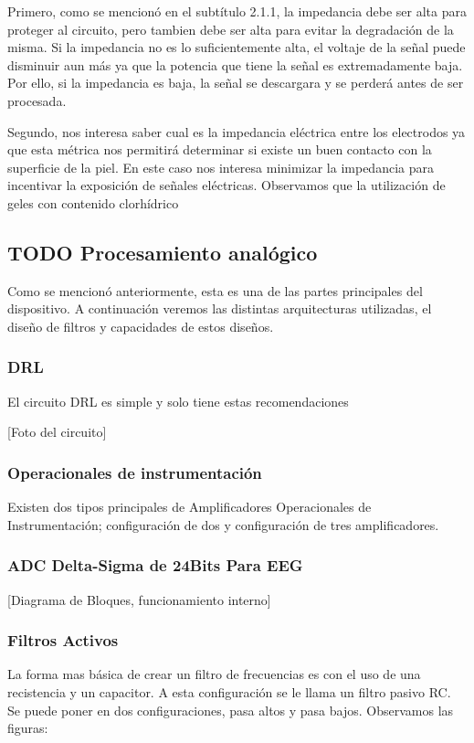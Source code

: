 \documentclass[11pt]{article}
\begin{document}
\begin{enumerate}
Primero, como se mencionó en el subtítulo 2.1.1, la impedancia debe ser alta para proteger al circuito, pero tambien debe ser alta para evitar la degradación de la misma. Si la impedancia no es lo suficientemente alta, el voltaje de la señal puede disminuir aun más ya que la potencia que tiene la señal es extremadamente baja. Por ello, si la impedancia es baja, la señal se descargara y se perderá antes de ser procesada.

Segundo, nos interesa saber cual es la impedancia eléctrica entre los electrodos ya que esta métrica nos permitirá determinar si existe un buen contacto con la superficie de la piel. En este caso nos interesa minimizar la impedancia para incentivar la exposición de señales eléctricas. Observamos que la utilización de geles con contenido clorhídrico
\end{enumerate}

\subsection{{\bfseries\sffamily TODO} Procesamiento analógico}
\label{sec:org9cb2bfb}
Como se mencionó anteriormente, esta es una de las partes principales del dispositivo. A continuación veremos las distintas arquitecturas utilizadas, el diseño de filtros y capacidades de estos diseños.

\subsubsection{DRL}
\label{sec:org54b5a6e}
El circuito DRL es simple y solo tiene estas recomendaciones 

[Foto del circuito]

\subsubsection{Operacionales de instrumentación}
\label{sec:orgcd66827}
Existen dos tipos principales de Amplificadores Operacionales de Instrumentación; configuración de dos y configuración de tres amplificadores.

\subsubsection{ADC Delta-Sigma de 24Bits Para EEG}
\label{sec:orge87d76c}

[Diagrama de Bloques, funcionamiento interno]

\subsubsection{Filtros Activos}
\label{sec:orga0c3d6f}
La forma mas básica de crear un filtro de frecuencias es con el uso de una recistencia y un capacitor. A esta configuración se le llama un filtro pasivo RC. Se puede poner en dos configuraciones, pasa altos y pasa bajos. Observamos las figuras:
\end{document}

